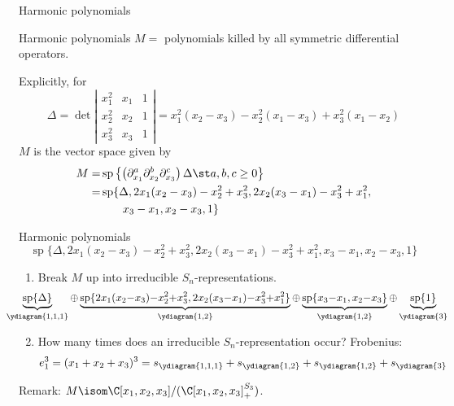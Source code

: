 \documentclass[dvipsnames]{beamer}
\renewcommand{\Span}{\operatorname{sp}}
\theoremstyle{definition}
\begin{document}
\begin{frame}{Harmonic polynomials}
  \begin{block}{Harmonic polynomials}
   \(M =\) polynomials killed by all symmetric differential
   operators.
  \end{block}\pause
  Explicitly, for
   \[
     \Delta = \det \left|
       \begin{matrix}
         x_1^2 & x_1 & 1\\
         x_2^2 & x_2 & 1\\
         x_3^2 & x_3 & 1
       \end{matrix}
     \right| = x_1^2(x_2-x_3) - x_2^2 (x_1 - x_3) + x_3^2(x_1-x_2)
   \]\pause
   \(M\) is the vector space given by\pause
   \begin{align*}
       M  = & \Span\left\{
\left(           \partial_{x_1}^a
           \partial_{x_2}^b  \partial_{x_3}^c
\right)         \Delta \st a,b,c \geq 0\right\} \\
        = & \Span\{\Delta, 2x_1(x_2-x_3)-x_2^2+x_3^2,
            2x_2(x_3-x_1)-x_3^2+x_1^2, \\
       & \phantom{\Span\{\}}x_3-x_1, x_2-x_3,1\}
   \end{align*}
\end{frame}
\begin{frame}{Harmonic polynomials}
\[
\Span\{\Delta, 2x_1(x_2-x_3)-x_2^2+x_3^2,
            2x_2(x_3-x_1)-x_3^2+x_1^2, 
       x_3-x_1, x_2-x_3,1\}
  \]\pause 
  \begin{enumerate}
\item Break \(M\) up into irreducible \(S_n\)-representations. \pause
  \[
    \hspace{-2.9em}
    \scalebox{0.95}{\(
      \underbrace{\Span\{\Delta\}}_{\ydiagram{1,1,1}} {\oplus} \underbrace{\Span\{2x_1(x_2{-}x_3){-}x_2^2{+}x_3^2,
        2x_2(x_3{-}x_1){-}x_3^2{+}x_1^2\}}_{\ydiagram{1,2}} {\oplus}
      \underbrace{\Span\{x_3{-}x_1, x_2{-}x_3\}}_{\ydiagram{1,2}} {\oplus} \underbrace{\Span\{1\}}_{\ydiagram{3}}\)}
  \]\pause
  \item How many times does an irreducible \(S_n\)-representation occur? \pause
    Frobenius: \pause
    \[
      e_1^3 = (x_1+x_2+x_3)^3 = s_{\ydiagram{1,1,1}} + s_{\ydiagram{1,2}} +
      s_{\ydiagram{1,2}} + s_{\ydiagram{3}}
    \]
  \end{enumerate}
  \pause
  Remark: \(M \isom \C[x_1,x_2,x_3]/(\C[x_1,x_2,x_3]^{S_3}_+)\).
\end{frame}
\end{document}

